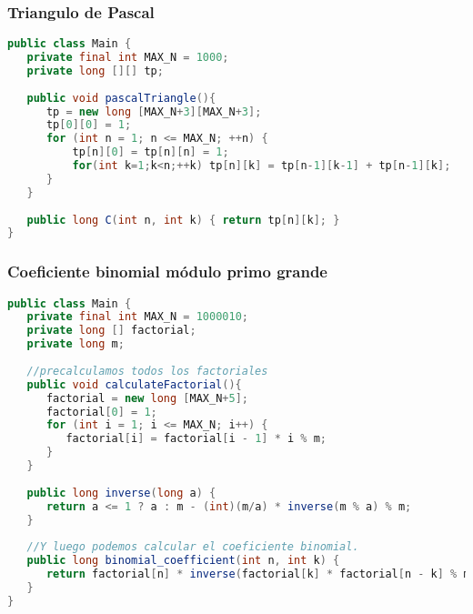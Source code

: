 \subsubsection{Triangulo de Pascal}
\begin{lstlisting}[language=Java]
public class Main {
   private final int MAX_N = 1000;
   private long [][] tp;
	
   public void pascalTriangle(){
      tp = new long [MAX_N+3][MAX_N+3];	
      tp[0][0] = 1;
      for (int n = 1; n <= MAX_N; ++n) {
          tp[n][0] = tp[n][n] = 1;
          for(int k=1;k<n;++k) tp[n][k] = tp[n-1][k-1] + tp[n-1][k];
      }
   }
	
   public long C(int n, int k) { return tp[n][k]; }
}
\end{lstlisting}

\subsubsection{Coeficiente binomial módulo primo grande}
\begin{lstlisting}[language=Java]
public class Main {
   private final int MAX_N = 1000010;
   private long [] factorial;
   private long m;
	
   //precalculamos todos los factoriales
   public void calculateFactorial(){
      factorial = new long [MAX_N+5];
      factorial[0] = 1;
      for (int i = 1; i <= MAX_N; i++) {
         factorial[i] = factorial[i - 1] * i % m;
      }
   }
	
   public long inverse(long a) {
      return a <= 1 ? a : m - (int)(m/a) * inverse(m % a) % m;
   }	
	
   //Y luego podemos calcular el coeficiente binomial.
   public long binomial_coefficient(int n, int k) {
      return factorial[n] * inverse(factorial[k] * factorial[n - k] % m) % m;
   }
}
\end{lstlisting}